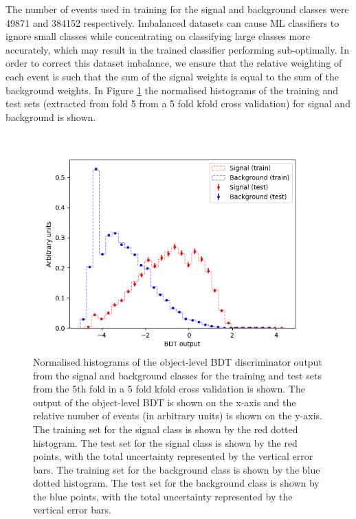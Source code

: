 The number of events used in training for the signal and background classes were 49871 and 384152 respectively. Imbalanced datasets can cause ML classifiers to ignore small classes while concentrating on classifying large classes more accurately, which may result in the trained classifier performing sub-optimally. In order to correct this dataset imbalance, we ensure that the relative weighting of each event is such that the sum of the signal weights is equal to the sum of the background weights.
In Figure \ref{fig:object-bdt-overtrain-check} the normalised histograms of the training and test sets (extracted from fold 5 from a 5 fold kfold cross validation) for signal and background is shown.


\begin{figure}[h!]
	\includegraphics[scale=0.45]{figures/overtrainingCheck_4lep_lb.png}
	\centering
	\caption{Normalised histograms of the object-level BDT discriminator output from the signal and background classes for the training and test sets from the 5th fold in a 5 fold kfold cross validation is shown. The output of the object-level BDT is shown on the x-axis and the relative number of events (in arbitrary units) is shown on the y-axis. The training set for the signal class is shown by the red dotted histogram. The test set for the signal class is shown by the red points, with the total uncertainty represented by the vertical error bars. The training set for the background class is shown by the blue dotted histogram. The test set for the background class is shown by the blue points, with the total uncertainty represented by the vertical error bars.}
	\label{fig:object-bdt-overtrain-check}
\end{figure}

